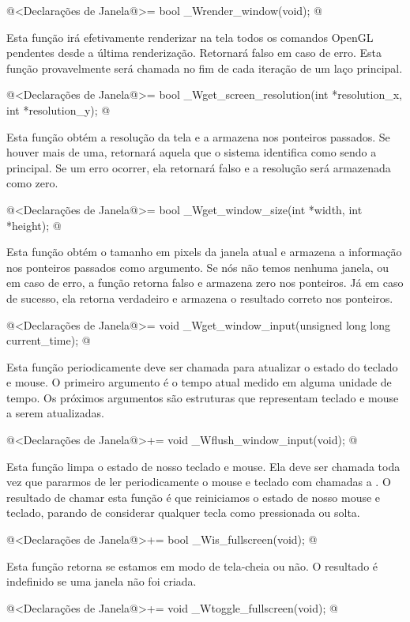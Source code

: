 \iniciocodigo
@<Declarações de Janela@>=
bool _Wrender_window(void);
@
\fimcodigo

Esta função irá efetivamente renderizar na tela todos os comandos
OpenGL pendentes desde a última renderização. Retornará falso em caso
de erro. Esta função provavelmente será chamada no fim de cada
iteração de um laço principal.

\iniciocodigo
@<Declarações de Janela@>=
bool _Wget_screen_resolution(int *resolution_x, int *resolution_y);
@
\fimcodigo

Esta função obtém a resolução da tela e a armazena nos ponteiros
passados. Se houver mais de uma, retornará aquela que o sistema
identifica como sendo a principal. Se um erro ocorrer, ela retornará
falso e a resolução será armazenada como zero.

\iniciocodigo
@<Declarações de Janela@>=
bool _Wget_window_size(int *width, int *height);
@
\fimcodigo

Esta função obtém o tamanho em pixels da janela atual e armazena a
informação nos ponteiros passados como argumento. Se nós não temos
nenhuma janela, ou em caso de erro, a função retorna falso e armazena
zero nos ponteiros. Já em caso de sucesso, ela retorna verdadeiro e
armazena o resultado correto nos ponteiros.

\iniciocodigo
@<Declarações de Janela@>=
void _Wget_window_input(unsigned long long current_time);
@
\fimcodigo

Esta função periodicamente deve ser chamada para atualizar o estado do
teclado e mouse. O primeiro argumento é o tempo atual medido em alguma
unidade de tempo. Os próximos argumentos são estruturas que
representam teclado e mouse a serem atualizadas.

\iniciocodigo
@<Declarações de Janela@>+=
void _Wflush_window_input(void);
@
\fimcodigo

Esta função limpa o estado de nosso teclado e mouse. Ela deve ser
chamada toda vez que pararmos de ler periodicamente o mouse e teclado
com chamadas a . O resultado de
chamar esta função é que reiniciamos o estado de nosso mouse e
teclado, parando de considerar qualquer tecla como pressionada ou
solta.

\iniciocodigo
@<Declarações de Janela@>+=
bool _Wis_fullscreen(void);
@
\fimcodigo

Esta função retorna se estamos em modo de tela-cheia ou não. O
resultado é indefinido se uma janela não foi criada.

\iniciocodigo
@<Declarações de Janela@>+=
void _Wtoggle_fullscreen(void);
@
\fimcodigo

